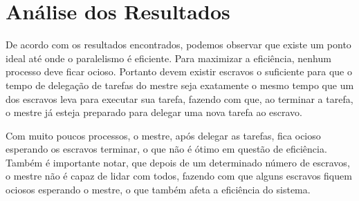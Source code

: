 \section{Análise dos Resultados}

	De acordo com os resultados encontrados, podemos observar que existe um ponto ideal até onde o paralelismo é eficiente. Para maximizar a eficiência, nenhum processo deve ficar ocioso. Portanto devem existir escravos o suficiente para que o tempo de delegação de tarefas do mestre seja exatamente o mesmo tempo que um dos escravos leva para executar sua tarefa, fazendo com que, ao terminar a tarefa, o mestre já esteja preparado para delegar uma nova tarefa ao escravo.
	
	Com muito poucos processos, o mestre, após delegar as tarefas, fica ocioso esperando os escravos terminar, o que não é ótimo em questão de eficiência. Também é importante notar, que depois de um determinado número de escravos, o mestre não é capaz de lidar com todos, fazendo com que alguns escravos fiquem ociosos esperando o mestre, o que também afeta a eficiência do sistema.